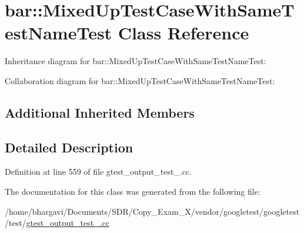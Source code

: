 \hypertarget{classbar_1_1_mixed_up_test_case_with_same_test_name_test}{}\section{bar\+:\+:Mixed\+Up\+Test\+Case\+With\+Same\+Test\+Name\+Test Class Reference}
\label{classbar_1_1_mixed_up_test_case_with_same_test_name_test}


Inheritance diagram for bar\+:\+:Mixed\+Up\+Test\+Case\+With\+Same\+Test\+Name\+Test\+:


Collaboration diagram for bar\+:\+:Mixed\+Up\+Test\+Case\+With\+Same\+Test\+Name\+Test\+:
\subsection*{Additional Inherited Members}


\subsection{Detailed Description}


Definition at line 559 of file gtest\+\_\+output\+\_\+test\+\_\+.\+cc.



The documentation for this class was generated from the following file\+:\begin{DoxyCompactItemize}
\item 
/home/bhargavi/\+Documents/\+S\+D\+R/\+Copy\+\_\+\+Exam\+\_\+X/vendor/googletest/googletest/test/\hyperlink{gtest__output__test___8cc}{gtest\+\_\+output\+\_\+test\+\_\+.\+cc}\end{DoxyCompactItemize}
